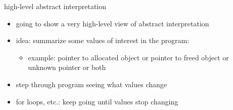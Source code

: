 \begin{frame}{high-level abstract interpretation}
    \begin{itemize}
    \item going to show a very high-level view of abstract interpretation
    \vspace{.5cm}
    \item idea: summarize some values of interest in the program:
        \begin{itemize}
        \item example: pointer to allocated object or pointer to freed object or unknown pointer or both
        \end{itemize}
    \item step through program seeing what values change
    \item for loops, etc.: keep going until values stop changing
    \end{itemize}
\end{frame}
